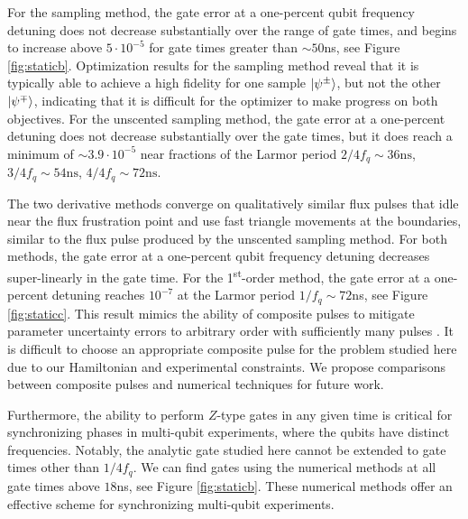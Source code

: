 For the sampling method, the gate error at a one-percent qubit frequency detuning
does not decrease substantially over the
range of gate times, and begins to increase above $5 \cdot 10^{-5}$ for gate times
greater than $\sim 50$ns, see Figure \ref{fig:staticb}.
Optimization results for the sampling method reveal that it is typically
able to achieve a high fidelity for
one sample $\ket{\psi^{\pm}}$,
but not the other $\ket{\psi^{\mp}}$, indicating that it is difficult for the optimizer
to make progress on both objectives.
For the unscented sampling method,
the gate error at a one-percent detuning
does not decrease substantially 
over the gate times, but it does reach
a minimum of $\sim 3.9 \cdot 10^{-5}$
near fractions of the Larmor period $2/4f_{q} \sim 36\textrm{ns}$,
$3/4f_{q} \sim 54\textrm{ns}$, $4/4f_{q} \sim 72\textrm{ns}$.

The two derivative methods converge on qualitatively similar flux pulses that
idle near the flux frustration point and use fast triangle movements at the boundaries,
similar to the flux pulse produced by the unscented sampling method.
For both methods, the gate error at a one-percent qubit frequency detuning
decreases super-linearly in the gate time.
For the 1\textsuperscript{st}-order method, the gate error at a one-percent detuning 
reaches $10^{-7}$ at the Larmor period $1 / f_{q} \sim 72$ns,
see Figure \ref{fig:staticc}.
This result mimics the
ability of composite pulses to mitigate parameter uncertainty errors to arbitrary
order with sufficiently many pulses \cite{merrill2014progress}.
It is difficult to choose an appropriate composite pulse
for the problem studied here due to our Hamiltonian and experimental constraints.
We propose comparisons between composite pulses and numerical techniques
for future work.

Furthermore, the ability to perform
$Z$-type gates in any given time is critical
for synchronizing phases in multi-qubit experiments,
where the qubits have distinct
frequencies. Notably, the analytic gate studied here cannot be extended
to gate times other than $1 / 4 f_{q}$. 
We can find gates using the numerical methods at
all gate times above $18$ns, see Figure \ref{fig:staticb}.
These numerical methods offer an effective scheme for synchronizing
multi-qubit experiments.
